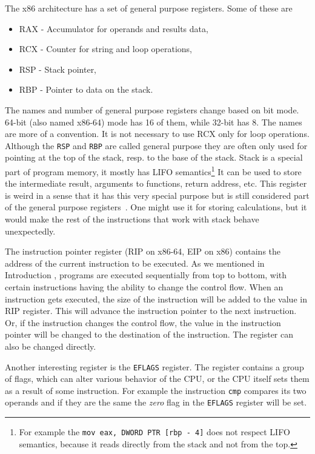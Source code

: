 The x86 architecture has a set of general purpose registers.
Some of these are
\begin{itemize}
    \item RAX - Accumulator for operands and results data,
    \item RCX - Counter for string and loop operations,
    \item RSP - Stack pointer,
    \item RBP - Pointer to data on the stack.
\end{itemize}
The names and number of general purpose registers change based on bit mode.
64-bit (also named x86-64) mode has 16 of them, while 32-bit has 8. The names
are more of a convention. It is not necessary to use RCX only for loop
operations. Although the \texttt{RSP} and \texttt{RBP} are called general
purpose they are often only used for pointing at the top of the stack, resp. to
the base of the stack. Stack is a special part of program memory, it mostly has
LIFO semantics\footnote{For example the \texttt{mov eax, DWORD PTR [rbp - 4]}
does not respect LIFO semantics, because it reads directly from the stack and
not from the top.} It can be used to store the intermediate result, arguments
to functions, return address, etc. This register is weird in a sense that it
has this very special purpose but is still considered part of the general
purpose registers~\cite{intel-manual}. One might use it for storing
calculations, but it would make the rest of the instructions that work with
stack behave unexpectedly.

The instruction pointer register (RIP on x86-64, EIP on x86) contains the
address of the current instruction to be executed. As we mentioned in
Introduction , programs are executed sequentially from top to bottom,
with certain instructions having the ability to change the control flow. When
an instruction gets executed, the size of the instruction will be added to the
value in RIP register. This will advance the instruction pointer to the next
instruction. Or, if the instruction changes the control flow, the value in the
instruction pointer will be changed to the destination of the instruction. The
register can also be changed directly.

Another interesting register is the \texttt{EFLAGS} register. The register
contains a group of flags, which can alter various behavior of the CPU, or the
CPU itself sets them as a result of some instruction. For example the
instruction \texttt{cmp} compares its two operands and if they are the same the
\textit{zero} flag in the \texttt{EFLAGS} register will be set.

